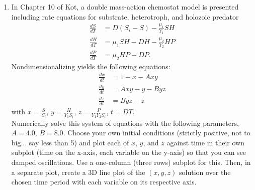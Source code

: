 \documentclass[11pt]{article}
\begin{document}
\begin{enumerate}
	\item In Chapter 10 of Kot, a double mass-action chemostat model is presented including rate equations for substrate, heterotroph, and holozoic predator
	\begin{align*}
		\frac{dS}{dT} &= D(S_i-S) - \frac{\mu_1}{Y_1}SH\\
		\frac{dH}{dT} &= \mu_1SH - DH - \frac{\mu_2}{Y_2}HP\\
		\frac{dP}{dT} &= \mu_2HP - DP.
	\end{align*}
	Nondimensionalizing yields the following equations:
	\begin{align*}
		\frac{dx}{dt} &= 1-x-Axy\\
		\frac{dy}{dt} &= Axy-y-Byz\\
		\frac{dz}{dt} &= Byz-z
	\end{align*}
	with $x=\frac{S}{S_i}$, $y=\frac{H}{Y_1S_i}$, $z=\frac{P}{Y_1Y_2S_i}$, $t=DT$.\\
	Numerically solve this system of equations with the following parameters,\\
	$A=4.0$, $B=8.0$. Choose your own initial conditions (strictly positive, not to big... say less than 5) and plot each of $x$, $y$, and $z$ against time in their own subplot (time on the x-axis, each variable on the y-axis) so that you can see damped oscillations. Use a one-column (three rows) subplot for this. Then, in a separate plot, create a 3D line plot of the $(x,y,z)$ solution over the chosen time period with each variable on its respective axis.
\end{enumerate}
\end{document}
